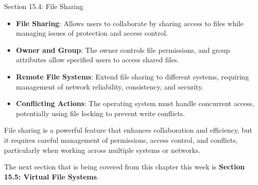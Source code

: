 \begin{notes}{Section 15.4: File Sharing}
\begin{highlight}
    \end{highlight}
    
    \begin{highlight}
    
        \begin{itemize}
            \item \textbf{File Sharing}: Allows users to collaborate by sharing access to files while managing issues of protection and access control.
            \item \textbf{Owner and Group}: The owner controls file permissions, and group attributes allow specified users to access shared files.
            \item \textbf{Remote File Systems}: Extend file sharing to different systems, requiring management of network reliability, consistency, and security.
            \item \textbf{Conflicting Actions}: The operating system must handle concurrent access, potentially using file locking to prevent write conflicts.
        \end{itemize}
    
    File sharing is a powerful feature that enhances collaboration and efficiency, but it requires careful management of permissions, access control, and conflicts, particularly when working across 
    multiple systems or networks.
    
    \end{highlight}
\end{notes}

The next section that is being covered from this chapter this week is \textbf{Section 15.5: Virtual File Systems}.


